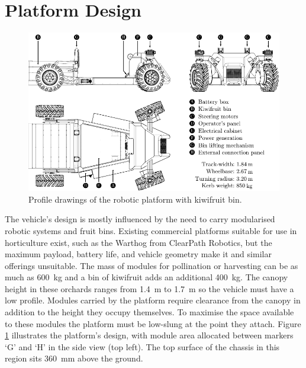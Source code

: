 \documentclass[preprint,authoryear,12pt]{elsarticle}
\begin{document}
\section{Platform Design}
\label{sect:design}

        \begin{figure}[htb]
            \centering
            \includegraphics[width=\linewidth]{imgs/profile_views/AMMP-All-Labelled.pdf}
            \caption{Profile drawings of the robotic platform with kiwifruit bin.}
            \label{fig:AMMP}
        \end{figure}

        The vehicle's design is mostly influenced by the need to carry modularised robotic systems and fruit bins.
        Existing commercial platforms suitable for use in horticulture exist, such as the Warthog from ClearPath Robotics, but the maximum payload, battery life, and vehicle geometry make it and similar offerings unsuitable.
        The mass of modules for pollination or harvesting can be as much as \SI{600}{\kilo\gram} and a bin of kiwifruit adds an additional \SI{400}{\kilo\gram}.
        The canopy height in these orchards ranges from \SI{1.4}{\meter} to \SI{1.7}{\meter} so the vehicle must have a low profile.
        Modules carried by the platform require clearance from the canopy in addition to the height they occupy themselves.
        To maximise the space available to these modules the platform must be low-slung at the point they attach.
        Figure \ref{fig:AMMP} illustrates the platform's design, with module area allocated between markers `G' and `H' in the side view (top left).
        The top surface of the chassis in this region sits \SI{360}{\milli\meter} above the ground.
\end{document}
